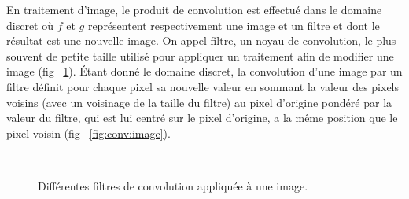 En traitement d'image, le produit de convolution est effectué dans le domaine discret où $f$ et $g$ représentent respectivement une image et un filtre et dont le résultat est une nouvelle image. On appel filtre, un noyau de convolution, le plus souvent de petite taille utilisé pour appliquer un traitement afin de modifier une image (fig ~\ref{fig:conv:filter}). Étant donné le domaine discret, la convolution d'une image par un filtre définit pour chaque pixel sa nouvelle valeur en sommant la valeur des pixels voisins (avec un voisinage de la taille du filtre) au pixel d'origine pondéré par la valeur du filtre, qui est lui centré sur le pixel d'origine, a la même position que le pixel voisin (fig ~\ref{fig:conv:image}). %

\begin{figure}[H]
\centering
      \\
\caption{Différentes filtres de convolution appliquée à une image.}
\label{fig:conv:filter}
\end{figure}

